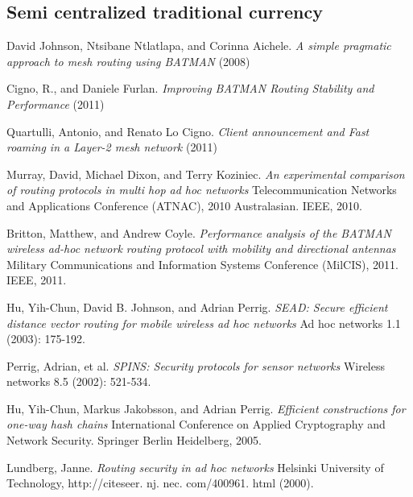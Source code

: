 \documentclass[11pt]{article}
\begin{document}
    \subsection{Semi centralized traditional currency}

\medskip


\begin{thebibliography}{1}



David Johnson, Ntsibane Ntlatlapa, and Corinna Aichele.
\textit{A simple pragmatic approach to mesh routing using BATMAN} (2008)

Cigno, R., and Daniele Furlan.
\textit{Improving BATMAN Routing Stability and Performance} (2011)

Quartulli, Antonio, and Renato Lo Cigno.
\textit{Client announcement and Fast roaming in a Layer-2 mesh network} (2011)

Murray, David, Michael Dixon, and Terry Koziniec.
\textit{An experimental comparison of routing protocols in multi hop ad hoc networks} Telecommunication Networks and Applications Conference (ATNAC), 2010 Australasian. IEEE, 2010.

Britton, Matthew, and Andrew Coyle.
\textit{Performance analysis of the BATMAN wireless ad-hoc network routing protocol with mobility and directional antennas} Military Communications and Information Systems Conference (MilCIS), 2011. IEEE, 2011.

Hu, Yih-Chun, David B. Johnson, and Adrian Perrig. 
\textit{SEAD: Secure efficient distance vector routing for mobile wireless ad hoc networks} Ad hoc networks 1.1 (2003): 175-192.

Perrig, Adrian, et al. 
\textit{SPINS: Security protocols for sensor networks} Wireless networks 8.5 (2002): 521-534.

Hu, Yih-Chun, Markus Jakobsson, and Adrian Perrig. 
\textit{Efficient constructions for one-way hash chains} International Conference on Applied Cryptography and Network Security. Springer Berlin Heidelberg, 2005.

Lundberg, Janne. 
\textit{Routing security in ad hoc networks} Helsinki University of Technology, http://citeseer. nj. nec. com/400961. html (2000).

\end{thebibliography}
\end{document}
